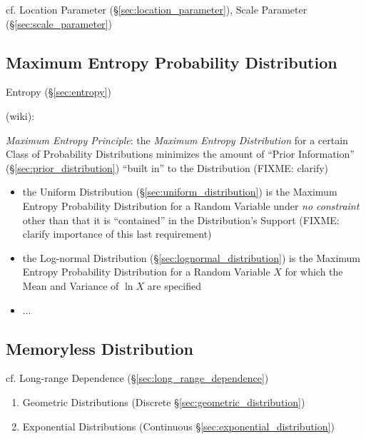 \fist cf. Location Parameter (\S\ref{sec:location_parameter}), Scale Parameter
(\S\ref{sec:scale_parameter})



\subsection{Maximum Entropy Probability Distribution}\label{sec:maximum_entropy}

Entropy (\S\ref{sec:entropy})

(wiki):

\emph{Maximum Entropy Principle}: the \emph{Maximum Entropy Distribution} for a
certain Class of Probability Distributions minimizes the amount of ``Prior
Information'' (\S\ref{sec:prior_distribution}) ``built in'' to the Distribution
(FIXME: clarify)

\begin{itemize}
  \item the Uniform Distribution (\S\ref{sec:uniform_distribution}) is the
    Maximum Entropy Probability Distribution for a Random Variable under
    \emph{no constraint} other than that it is ``contained'' in the
    Distribution's Support (FIXME: clarify importance of this last requirement)
  \item the Log-normal Distribution (\S\ref{sec:lognormal_distribution}) is the
    Maximum Entropy Probability Distribution for a Random Variable $X$ for which
    the Mean and Variance of $\ln X$ are specified
  \item ...
\end{itemize}



\subsection{Memoryless Distribution}\label{sec:memoryless_distribution}

cf. Long-range Dependence (\S\ref{sec:long_range_dependence})

\begin{enumerate}
  \item Geometric Distributions (Discrete \S\ref{sec:geometric_distribution})
  \item Exponential Distributions (Continuous
    \S\ref{sec:exponential_distribution})
\end{enumerate}


